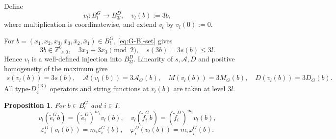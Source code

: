 \documentclass[11pt,reqno]{amsart}
\newcommand{\Zge}{\mathbb Z_{\ge 0}}
\numberwithin{table}{section}
\numberwithin{equation}{section}
\theoremstyle{plain}
\newtheorem{proposition}[theorem]{Proposition}
\theoremstyle{definition}
\begin{document}
Define
\begin{equation}\label{eq:G-similarity-map}
	v_l:B_l^G\longrightarrow B_{3l}^D,
	\quad
	v_l(b):=3b,
\end{equation}
where multiplication is coordinatewise, and extend \(v_l\) by
\(v_l(0):=0\).

For \(b=(x_1,x_2,x_3,\bar x_3,\bar x_2,\bar x_1)\in B_l^G\),
\eqref{eq:G-Bl-set} gives
\[
3b\in\Zge^6,
\quad
3x_3\equiv3\bar x_3\!\!\!\!\pmod2,
\quad
s(3b)=3s(b)\le3l.
\]
Hence \(v_l\) is a well-defined injection into \(B_{3l}^D\).
Linearity of \(s,\mathcal A,D\) and positive homogeneity of
the maximum give
\begin{equation}\label{eq:G-coordinate-homogeneity}
	\begin{aligned}
		s(v_l(b))=3s(b),
		\quad
		\mathcal A(v_l(b))=3\mathcal A_G(b),
		\quad
		M(v_l(b))=3M_G(b),
		\quad
		D(v_l(b))=3D_G(b).
	\end{aligned}
\end{equation}
All type-\(D_4^{(3)}\) operators and string functions at
\(v_l(b)\) are taken at level \(3l\).

\begin{proposition}
	\label{prop:G-one-factor-similarity}
	For \(b\in B_l^G\) and \(i\in I\),
	\begin{equation}\label{eq:operator-identities}
	v_l(\widetilde e_i^G b)
	=
	(\widetilde e_i^D)^{m_i}v_l(b),
	\quad
	v_l(\widetilde f_i^G b)
	=
	(\widetilde f_i^D)^{m_i}v_l(b),
	\end{equation}
	\begin{equation}\label{eq:G-one-factor-string-scaling}
		\varepsilon_i^D(v_l(b))
		=
		m_i\varepsilon_i^G(b),
		\quad
		\varphi_i^D(v_l(b))
		=
		m_i\varphi_i^G(b).
	\end{equation}
\end{proposition}
\end{document}
